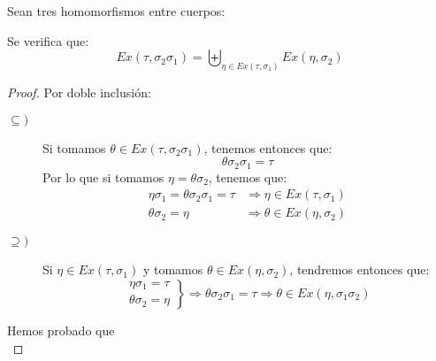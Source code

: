 \begin{lema}
    Sean tres homomorfismos entre cuerpos:
    \begin{figure}[H]
        \centering
    \end{figure}
    Se verifica que:
    \begin{equation*}
        Ex(\tau,\sigma_2\sigma_1) = \biguplus_{\eta \in Ex(\tau,\sigma_1)} Ex(\eta,\sigma_2)
    \end{equation*}
    \begin{proof}
        Por doble inclusión:
        \begin{description}
            \item [$\subseteq )$] Si tomamos $\theta \in Ex(\tau,\sigma_2\sigma_1)$, tenemos entonces que:
                \begin{equation*}
                    \theta\sigma_2\sigma_1 = \tau
                \end{equation*}
                Por lo que si tomamos $\eta = \theta\sigma_2$, tenemos que:
                \begin{align*}
                    \eta\sigma_1 =\theta\sigma_2\sigma_1 = \tau &\Longrightarrow \eta \in Ex(\tau,\sigma_1) \\
                    \theta\sigma_2 = \eta &\Longrightarrow \theta \in Ex(\eta, \sigma_2)
                \end{align*}
            \item [$\supseteq )$] Si $\eta \in Ex(\tau,\sigma_1)$ y tomamos $\theta\in Ex(\eta,\sigma_2)$, tendremos entonces que:
                \begin{equation*}
                    \left.\begin{array}{l}
                        \eta\sigma_1 = \tau \\
                        \theta\sigma_2 = \eta
                    \end{array}\right\}\Longrightarrow \theta\sigma_2\sigma_1 = \tau \Longrightarrow \theta\in Ex(\eta,\sigma_1\sigma_2)
                \end{equation*}
        \end{description}
        Hemos probado que
        \begin{equation*}

\end{equation*}
\end{proof}
\end{lema}
